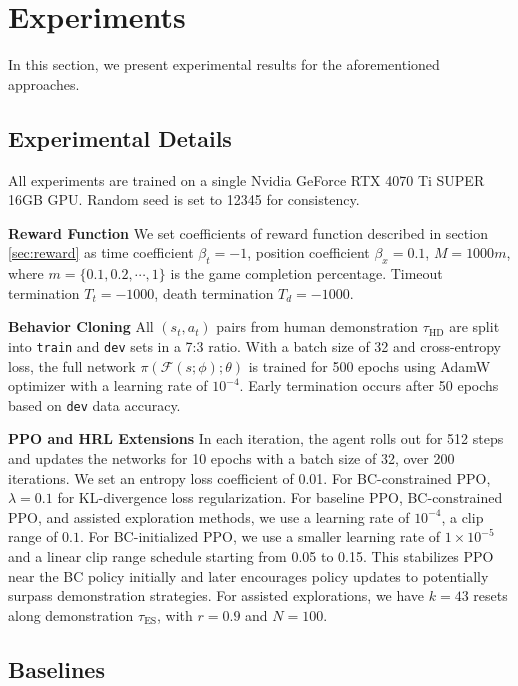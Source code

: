 \documentclass{article}
\begin{document}
\section{Experiments}
In this section, we present experimental results for the aforementioned 
approaches. 

\subsection{Experimental Details}
All experiments are trained on a single Nvidia GeForce RTX 4070 Ti 
SUPER 16GB GPU. Random seed is set to 12345 for consistency.

\textbf{Reward Function} We set coefficients of reward function described
in section \ref{sec:reward} as time coefficient $\beta_t = -1$, 
position coefficient $\beta_x = 0.1$, 
$M=1000m$, where $m=\{0.1, 0.2, \cdots, 1\}$ is the game completion percentage.
Timeout termination $T_t = -1000$, death termination $T_d = -1000$.

\textbf{Behavior Cloning} All $(s_t, a_t)$ 
pairs from human demonstration $\tau_{\text{HD}}$ are split into \texttt{train} and \texttt{dev} sets in a 7:3 ratio. 
With a batch size of 32 and cross-entropy loss, the full network 
$\pi(\mathcal{F}(s; \phi);\theta)$ is trained for 500 epochs using 
AdamW optimizer with a learning rate of $10^{-4}$. Early termination 
occurs after 50 epochs based on \texttt{dev} data accuracy.

\textbf{PPO and HRL Extensions} In each iteration, the agent rolls out for 
512 steps and updates the networks for 10 epochs with a batch size of 32, 
over 200 iterations. We set an entropy loss coefficient of 0.01. For 
BC-constrained PPO, $\lambda=0.1$ for KL-divergence loss regularization. For 
baseline PPO, BC-constrained PPO, and assisted exploration methods, we use 
a learning rate of $10^{-4}$, a clip range of $0.1$. For BC-initialized 
PPO, we use a smaller learning rate of $1\times10^{-5}$ and a linear clip 
range schedule starting from 0.05 to 0.15. This stabilizes PPO near the BC 
policy initially and later encourages policy updates to potentially surpass 
demonstration strategies. For assisted explorations, we have $k=43$ resets 
along demonstration $\tau_{\text{ES}}$, with $r=0.9$ and $N=100$.

\subsection{Baselines}


\clearpage


\end{document}

